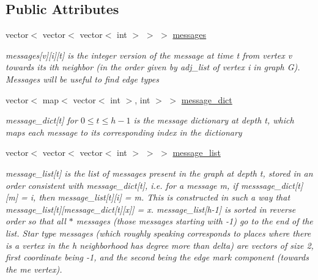 \subsection*{Public Attributes}
\begin{DoxyCompactItemize}
\item 
vector$<$ vector$<$ vector$<$ int $>$ $>$ $>$ \hyperlink{classgraph__message_aac77e098f0acf9650116a8e51fe3b4b7}{messages}
\begin{DoxyCompactList}\small\item\em messages\mbox{[}v\mbox{]}\mbox{[}i\mbox{]}\mbox{[}t\mbox{]} is the integer version of the message at time t from vertex v towards its ith neighbor (in the order given by adj\+\_\+list of vertex i in graph G). Messages will be useful to find edge types \end{DoxyCompactList}\item 
vector$<$ map$<$ vector$<$ int $>$, int $>$ $>$ \hyperlink{classgraph__message_ad0a6d35ac8550fb7ff03ce90fce7d5a5}{message\+\_\+dict}
\begin{DoxyCompactList}\small\item\em message\+\_\+dict\mbox{[}t\mbox{]} for $0 \leq t \leq h-1$ is the message dictionary at depth t, which maps each message to its corresponding index in the dictionary \end{DoxyCompactList}\item 
vector$<$ vector$<$ vector$<$ int $>$ $>$ $>$ \hyperlink{classgraph__message_aa17fdb629b423343edfafa97252763ef}{message\+\_\+list}
\begin{DoxyCompactList}\small\item\em message\+\_\+list\mbox{[}t\mbox{]} is the list of messages present in the graph at depth t, stored in an order consistent with message\+\_\+dict\mbox{[}t\mbox{]}, i.\+e. for a message m, if messsage\+\_\+dict\mbox{[}t\mbox{]}\mbox{[}m\mbox{]} = i, then message\+\_\+list\mbox{[}t\mbox{]}\mbox{[}i\mbox{]} = m. This is constructed in such a way that message\+\_\+list\mbox{[}t\mbox{]}\mbox{[}message\+\_\+dict\mbox{[}t\mbox{]}\mbox{[}x\mbox{]}\mbox{]} = x. message\+\_\+list\mbox{[}h-\/1\mbox{]} is sorted in reverse order so that all $\ast$ messages (those messages starting with -\/1) go to the end of the list. Star type messages (which roughly speaking corresponds to places where there is a vertex in the h neighborhood has degree more than delta) are vectors of size 2, first coordinate being -\/1, and the second being the edge mark component (towards the \textquotesingle{}me\textquotesingle{} vertex). \end{DoxyCompactList}\item 

\end{DoxyCompactItemize}

